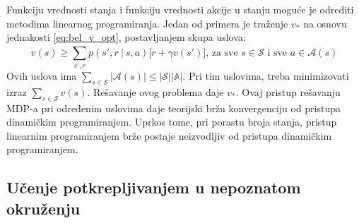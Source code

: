 \par 
Funkciju vrednosti stanja i funkciju vrednosti akcije u stanju moguće je odrediti metodima linearnog programiranja. Jedan od primera je traženje $v_*$ na osnovu jednakosti \eqref{eq:bel_v_opt}, postavljanjem skupa uslova:
\begin{equation}
	v(s) \geq \sum_{s', r}^{} p(s', r~|~s,a)\big[r+\gamma v(s')\big] \text{,~za~sve~} s \in \mathcal{S} \text{~i~sve~} a \in \mathcal{A}(s)
\end{equation}
Ovih uslova ima $\sum_{s \in \mathcal{S}}^{} |\mathcal{A}(s)| \leq |\mathcal{S}||\mathbb{A}|$. Pri tim uslovima, treba minimizovati izraz $\sum_{s \in \mathcal{S}}^{} v(s)$. Rešavanje ovog problema daje $v_*$. Ovaj pristup rešavanju MDP-a pri određenim uslovima daje teorijski bržu konvergenciju od pristupa dinamičkim programiranjem. Uprkos tome, pri porastu broja stanja, pristup linearnim programiranjem brže postaje neizvodljiv od pristupa dinamičkim programiranjem.

\subsection{Učenje potkrepljivanjem u nepoznatom okruženju}

